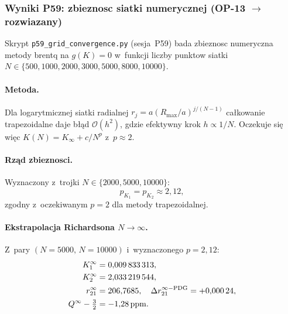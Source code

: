 \subsubsection{Wyniki P59: zbieznosc siatki numerycznej (OP-13 $\to$ rozwiazany)}%
\label{app:F-P59}

Skrypt \texttt{p59\_grid\_convergence.py} (sesja~P59) bada zbieznosc
numeryczna metody brentq na $g(K)=0$ w~funkcji liczby punktow
siatki $N\in\{500,1000,2000,3000,5000,8000,10000\}$.

\paragraph{Metoda.}
Dla logarytmicznej siatki radialnej $r_j=a(R_{\max}/a)^{j/(N-1)}$
ca\l{}kowanie trapezoidalne daje b\l{}\k{a}d $\mathcal{O}(h^2)$,
gdzie efektywny krok $h\propto 1/N$.
Oczekuje si\k{e} wi\k{e}c $K(N)=K_\infty+c/N^p$ z~$p\approx 2$.

\paragraph{Rz\k{a}d zbieznosci.}
Wyznaczony z~trojki $N\in\{2000,5000,10000\}$:
\begin{equation}
  p_{K_1} = p_{K_2} \approx 2{,}12,
  \label{eq:app:F-P59-order}
\end{equation}
zgodny z~oczekiwanym $p=2$ dla metody trapezoidalnej.

\paragraph{Ekstrapolacja Richardsona $N\to\infty$.}
Z~pary $(N=5000,\,N=10000)$ i~wyznaczonego $p=2{,}12$:
\begin{align}
  K_1^\infty &= 0{,}009\,833\,313, \notag\\
  K_2^\infty &= 2{,}033\,219\,544, \notag\\
  r_{21}^\infty &= 206{,}7685,\quad
    \Delta r_{21}^{\infty-\mathrm{PDG}} = {+}0{,}000\,24, \notag\\
  Q^\infty - \tfrac{3}{2} &= -1{,}28\,\mathrm{ppm}.
  \label{eq:app:F-P59-rich}
\end{align}


